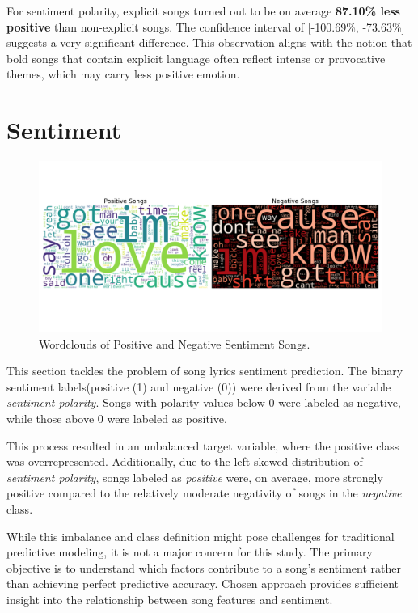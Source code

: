 For sentiment polarity, explicit songs turned out to be on average
\textbf{87.10\% less positive} than non-explicit songs. The confidence interval
of [-100.69\%, -73.63\%] suggests a very significant difference. This
observation aligns with the notion that bold songs that contain explicit
language often reflect intense or provocative themes, which may carry less
positive emotion.

\section{Sentiment}
\label{sec:sentiment}
\begin{center}
\begin{figure}[H]
  \centering
  \includegraphics[width=7in]{img/wordclouds.png}
  \caption{Wordclouds of Positive and Negative Sentiment Songs.}
  \label{Figure:fig_bh}
\end{figure}
\end{center}

This section tackles the problem of song lyrics sentiment prediction. The
binary sentiment labels(positive (1) and negative (0)) were derived from the
variable \textit{sentiment polarity}. Songs with polarity values below 0 were
labeled as negative, while those above 0 were labeled as positive.

This process resulted in an unbalanced target variable, where the positive
class was overrepresented. Additionally, due to the left-skewed distribution of
\textit{sentiment polarity}, songs labeled as \textit{positive} were, on
average, more strongly positive compared to the relatively moderate negativity
of songs in the \textit{negative} class.

While this imbalance and class definition might pose challenges for traditional
predictive modeling, it is not a major concern for this study. The primary
objective is to understand which factors contribute to a song's sentiment
rather than achieving perfect predictive accuracy. Chosen approach
provides sufficient insight into the relationship between song features and
sentiment.



